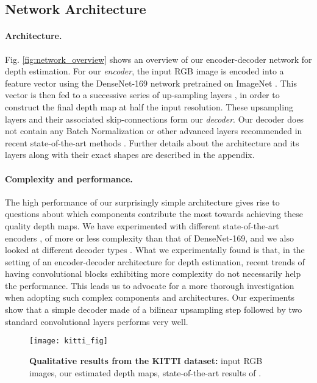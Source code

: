 \documentclass[10pt,twocolumn,letterpaper]{article}
\begin{document}
\subsection{Network Architecture}

\paragraph{Architecture.} Fig. \ref{fig:network_overview} shows an overview of our encoder-decoder network for depth estimation. For our \textit{encoder}, the input RGB image is encoded into a feature vector using the DenseNet-169 \cite{huang2017densely} network pretrained on ImageNet \cite{Deng2009}. This vector is then fed to a successive series of up-sampling layers \cite{LehtinenMHLKAA18}, in order to construct the final depth map at half the input resolution. These upsampling layers and their associated skip-connections form our \textit{decoder}. Our decoder does not contain any Batch Normalization \cite{Ioffe2015BNA} or other advanced layers recommended in recent state-of-the-art methods \cite{Fu2018DeepOR,Hao2018DetailPD}. Further details about the architecture and its layers along with their exact shapes are described in the appendix.

\paragraph{Complexity and performance.} The high performance of our surprisingly simple architecture gives rise to questions about which components contribute the most towards achieving these quality depth maps. We have experimented with different state-of-the-art encoders \cite{Bianco2018}, of more or less complexity than that of DenseNet-169, and we also looked at different decoder types \cite{Laina2016, Wojna2017TheDI}. What we experimentally found is that, in the setting of an encoder-decoder architecture for depth estimation, recent trends of having convolutional blocks exhibiting more complexity do not necessarily help the performance. This leads us to advocate for a more thorough investigation when adopting such complex components and architectures. Our experiments show that a simple decoder made of a  bilinear upsampling step followed by two standard convolutional layers performs very well.


\begin{figure*}[t]
\begin{center}
\texttt{[image: kitti\_fig]}
\end{center}
   \caption{\textbf{Qualitative results from the KITTI dataset:} input RGB images, our estimated depth maps, state-of-the-art results of \cite{Fu2018DeepOR}.}
\label{fig:kitti}
\end{figure*}
\end{document}
